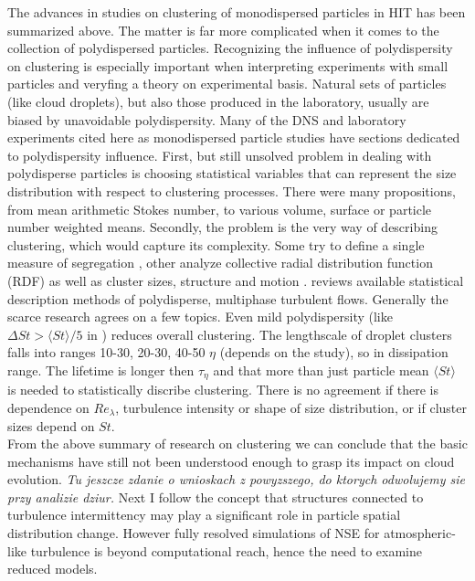 \documentclass[../main.tex]{subfiles}
\begin{document}
The advances in studies on clustering of monodispersed particles in HIT has been summarized above. The matter is far more complicated when it comes to the collection of polydispersed particles. Recognizing the influence of polydispersity on clustering is especially important when interpreting experiments with small particles and veryfing a theory on experimental basis. Natural sets of particles (like cloud droplets), but also those produced in the laboratory, usually are biased by unavoidable polydispersity. Many of the DNS and laboratory experiments cited here as monodispersed particle studies have sections dedicated to polydispersity influence. First, but still unsolved problem in dealing with polydisperse particles is choosing statistical variables that can represent the size distribution with respect to clustering processes. There were many propositions, from mean arithmetic Stokes number, to various volume, surface or particle number weighted means. Secondly, the problem is the very way of describing clustering, which would capture its complexity. Some try to define a single measure of segregation \citep{Calzavarini2008}, other analyze collective radial distribution function (RDF) \citep{Saw2012a, Saw2012b} as well as cluster sizes, structure and motion \citep{Lian2013, Lian2019}. \citet{Minier2016} reviews available statistical description methods of polydisperse, multiphase turbulent flows. Generally the scarce research agrees on a few topics. Even mild polydispersity (like $\Delta St > \langle St \rangle/5$ in \citet{Saw2012a, Saw2012b}) reduces overall clustering. The lengthscale of droplet clusters falls into ranges 10-30, 20-30, 40-50 $\eta$ (depends on the study), so in dissipation range. The lifetime is longer then $\tau_{\eta}$ and that more than just particle mean $\langle St \rangle$ is needed to statistically discribe clustering. There is no agreement if there is dependence on $Re_{\lambda}$, turbulence intensity or shape of size distribution, or if cluster sizes depend on $St$.\\
From the above summary of research on clustering we can conclude that the basic mechanisms have still not been understood enough to grasp its impact on cloud evolution. \emph{Tu jeszcze zdanie o wnioskach z powyzszego, do ktorych odwolujemy sie przy analizie dziur.} Next I follow the concept that structures connected to turbulence intermittency may play a significant role in particle spatial distribution change. However fully resolved simulations of NSE for atmospheric-like turbulence is beyond computational reach, hence the need to examine reduced models.
\end{document}

